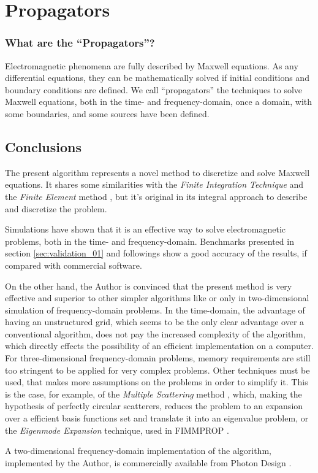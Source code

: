 \part{Propagators} \label{par:propagators} 

\section*{What are the ``Propagators''?}

Electromagnetic phenomena are fully described by Maxwell
equations. As any differential equations, they can be
mathematically solved if initial conditions and boundary conditions
are defined. We call ``propagators'' the techniques to solve Maxwell
equations, both in the time- and frequency-domain, once a domain, with
some boundaries, and some sources have been defined.









\chapter*{Conclusions}

The present algorithm represents a novel method to discretize and
solve Maxwell equations. It shares some similarities with the
\emph{Finite Integration Technique} and the \emph{Finite Element}
method \cite{bossavit_yee}, but it's original in its integral approach
to describe and discretize the problem.

Simulations have shown that it is an effective way to solve
electromagnetic problems, both in the time- and
frequency-domain. Benchmarks presented in section
\ref{sec:validation_01} and followings show a good accuracy of the
results, if compared with commercial software.

On the other hand, the Author is convinced that the present method is
very effective and superior to other simpler algorithms like \FDTD or
\FEM only in two-dimensional simulation of frequency-domain problems. In the
time-domain, the advantage of having an unstructured grid, which seems
to be the only clear advantage over a conventional \FDTD algorithm, does
not pay the increased complexity of the algorithm, which directly
effects the possibility of an efficient implementation on a
computer. For three-dimensional frequency-domain problems, memory requirements are
still too stringent to be applied for very complex problems. Other
techniques must be used, that makes more assumptions on the problems
in order to simplify it. This is the case, for example, of the
\emph{Multiple Scattering}
method \cite{tayeb_rigorous}, which, making the hypothesis of perfectly
circular scatterers, reduces the problem to an expansion over a
efficient basis functions set and translate it into an eigenvalue
problem, or the \emph{Eigenmode Expansion} technique, used in FIMMPROP
\cite{fimmprop}.

A two-dimensional frequency-domain implementation of the algorithm,
implemented by the Author, is commercially available from Photon
Design \cite{photond} .



